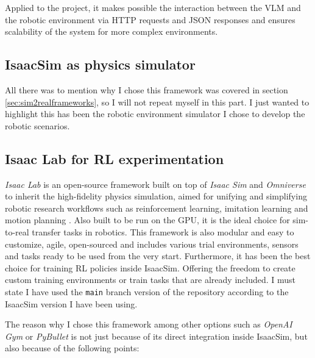 Applied to the project, it makes possible the interaction between the VLM and the robotic environment via HTTP requests and JSON responses and ensures scalability of the system for more complex environments. 

\subsection{IsaacSim as physics simulator}
All there was to mention why I chose this framework was covered in section \ref{sec:sim2realframeworks}, so I will not repeat myself in this part. I just wanted to highlight this has been the robotic environment simulator I chose to develop the robotic scenarios.

\subsection{Isaac Lab for RL experimentation}
\textit{Isaac Lab} is an open-source framework built on top of \textit{Isaac Sim} and \textit{Omniverse} to inherit the high-fidelity physics simulation, aimed for unifying and simplifying robotic research workflows such as reinforcement learning, imitation learning and motion planning \cite{mittal2025isaaclab}. Also built to be run on the GPU, it is the ideal choice for sim-to-real transfer tasks in robotics. This framework is also modular and easy to customize, agile, open-sourced and includes various trial environments, sensors and tasks ready to be used from the very start. Furthermore, it has been the best choice for training RL policies inside IsaacSim. Offering the freedom to create custom training environments or train tasks that are already included. I must state I have used the \texttt{main} branch version of the repository according to the IsaacSim version I have been using. 

The reason why I chose this framework among other options such as \textit{OpenAI Gym} or \textit{PyBullet} is not just because of its direct integration inside IsaacSim, but also because of the following points:

